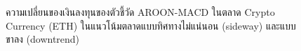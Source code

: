 \begin{figure}[!htb]
    \centering
    \caption{ความเปลี่ยนของเงินลงทุนของตัวชี้วัด AROON-MACD ในตลาด Crypto Currency (ETH) ในแนวโน้มตลาดแบบทิศทางไม่แน่นอน (sideway) และแบบขาลง (downtrend)}
\end{figure}

